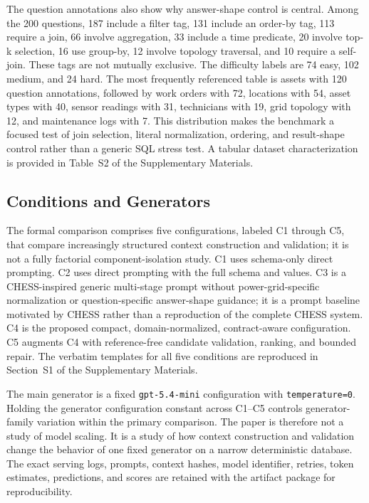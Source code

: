 \documentclass[cmc,article,submit,moreauthors,pdftex]{Definitions/tsp}
\begin{document}
The question annotations also show why answer-shape control is central. Among the 200 questions, 187 include a filter tag, 131 include an order-by tag, 113 require a join, 66 involve aggregation, 33 include a time predicate, 20 involve top-k selection, 16 use group-by, 12 involve topology traversal, and 10 require a self-join. These tags are not mutually exclusive. The difficulty labels are 74 easy, 102 medium, and 24 hard. The most frequently referenced table is assets with 120 question annotations, followed by work orders with 72, locations with 54, asset types with 40, sensor readings with 31, technicians with 19, grid topology with 12, and maintenance logs with 7. This distribution makes the benchmark a focused test of join selection, literal normalization, ordering, and result-shape control rather than a generic SQL stress test. A tabular dataset characterization is provided in Table~S2 of the Supplementary Materials.

\subsection{Conditions and Generators}\label{sect:e2}

The formal comparison comprises five configurations, labeled C1 through C5, that compare increasingly structured context construction and validation; it is not a fully factorial component-isolation study. C1 uses schema-only direct prompting. C2 uses direct prompting with the full schema and values. C3 is a CHESS-inspired generic multi-stage prompt without power-grid-specific normalization or question-specific answer-shape guidance; it is a prompt baseline motivated by CHESS rather than a reproduction of the complete CHESS system. C4 is the proposed compact, domain-normalized, contract-aware configuration. C5 augments C4 with reference-free candidate validation, ranking, and bounded repair. The verbatim templates for all five conditions are reproduced in Section~S1 of the Supplementary Materials.

The main generator is a fixed \texttt{gpt-5.4-mini} configuration with \texttt{temperature=0}. Holding the generator configuration constant across C1--C5 controls generator-family variation within the primary comparison. The paper is therefore not a study of model scaling. It is a study of how context construction and validation change the behavior of one fixed generator on a narrow deterministic database. The exact serving logs, prompts, context hashes, model identifier, retries, token estimates, predictions, and scores are retained with the artifact package for reproducibility.
\end{document}

